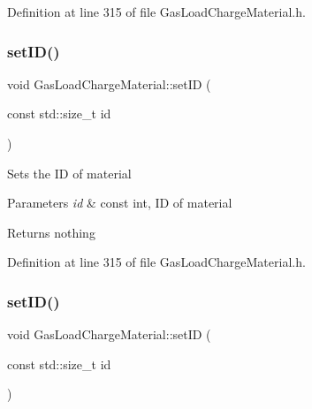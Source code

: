 Definition at line 315 of file Gas\+Load\+Charge\+Material.\+h.

\mbox{\label{class_gas_load_charge_material_a24b43ba7c871453258f458a8c1f15232}} 
\subsubsection{\texorpdfstring{set\+I\+D()}{setID()}\hspace{0.1cm}{\footnotesize\ttfamily [2/3]}}
{\footnotesize\ttfamily void Gas\+Load\+Charge\+Material\+::set\+ID (\begin{DoxyParamCaption}\item[{const std\+::size\+\_\+t}]{id }\end{DoxyParamCaption})\hspace{0.3cm}{\ttfamily [inline]}}

Sets the ID of material


\begin{DoxyParams}{Parameters}
{\em id} & const int, ID of material\\
\hline
\end{DoxyParams}
\begin{DoxyReturn}{Returns}
nothing 
\end{DoxyReturn}


Definition at line 315 of file Gas\+Load\+Charge\+Material.\+h.

\mbox{\label{class_gas_load_charge_material_a24b43ba7c871453258f458a8c1f15232}} 
\subsubsection{\texorpdfstring{set\+I\+D()}{setID()}\hspace{0.1cm}{\footnotesize\ttfamily [3/3]}}
{\footnotesize\ttfamily void Gas\+Load\+Charge\+Material\+::set\+ID (\begin{DoxyParamCaption}\item[{const std\+::size\+\_\+t}]{id }\end{DoxyParamCaption})\hspace{0.3cm}{\ttfamily [inline]}}

